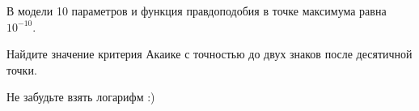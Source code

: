 
\begin{question}
В модели 10 параметров и функция правдоподобия в точке максимума равна \(10^{-10}\).

Найдите значение критерия Акаике с точностью до двух знаков после десятичной точки.
\end{question}

\begin{solution}
Не забудьте взять логарифм :)
\end{solution}

